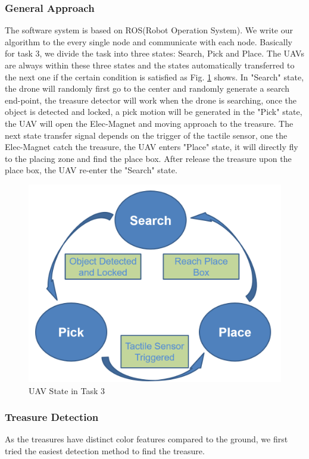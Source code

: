 \documentclass{standalone}
\begin{document}
\subsubsection{General Approach}
The software system is based on ROS(Robot Operation System). We write our algorithm to the every single node and communicate with each node. Basically for task 3, we divide the task into three states: Search, Pick and Place. The UAVs are always within these three states and the states automatically transferred to the next one if the certain condition is satisfied as Fig. \ref{t3state} shows. In "Search" state, the drone will randomly first go to the center and randomly generate a search end-point, the treasure detector will work when the drone is searching, once the object is detected and locked, a pick motion will be generated in the "Pick" state, the UAV will open the Elec-Magnet and moving approach to the treasure. The next state transfer signal depends on the trigger of the tactile sensor, one the Elec-Magnet catch the treasure, the UAV enters "Place" state, it will directly fly to the placing zone and find the place box. After release the treasure upon the place box, the UAV re-enter the "Search" state.
 \begin{figure}%
    \begin{center}
        \includegraphics[keepaspectratio=true, width=1\linewidth, height=0.20\textheight]{img//task3state.png}
      \end{center}
    \caption{UAV State in Task 3}
    \label{t3state}
    \end{figure}
\subsubsection{Treasure Detection}
As the treasures have distinct color features compared to the ground, we first tried the easiest detection method to find the treasure. 
\end{document}
